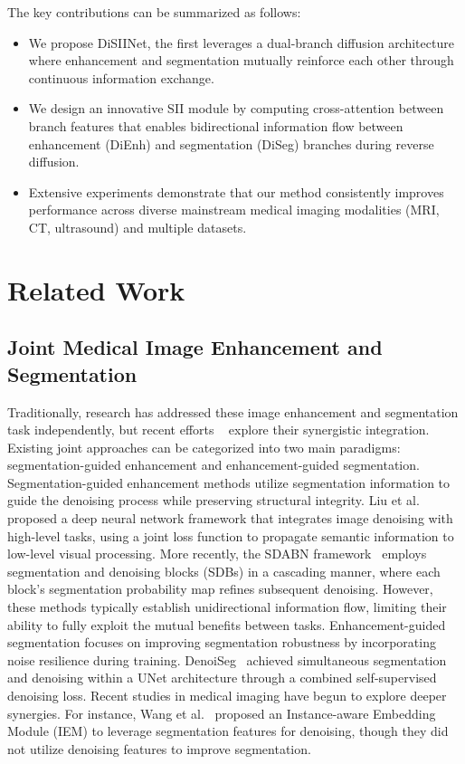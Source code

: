 \documentclass{article}
\begin{document}
The key contributions can be summarized as follows:

\begin{itemize}
\item We propose DiSIINet, the first leverages a dual-branch diffusion architecture where enhancement and segmentation mutually reinforce each other through continuous information exchange.

\item We design an innovative SII module by computing cross-attention between branch features that enables bidirectional information flow between enhancement (DiEnh) and segmentation (DiSeg) branches during reverse diffusion. 


\item Extensive experiments demonstrate that our method consistently improves performance across diverse mainstream medical imaging modalities (MRI, CT, ultrasound) and multiple datasets.
\end{itemize}



\section{Related Work}


\subsection{Joint Medical Image Enhancement and Segmentation}

Traditionally, research has addressed these image enhancement and segmentation task independently, but recent efforts ~\cite{xiao2024semantic} explore their synergistic integration. Existing joint approaches can be categorized into two main paradigms: segmentation-guided enhancement and enhancement-guided segmentation.
Segmentation-guided enhancement methods utilize segmentation information to guide the denoising process while preserving structural integrity. Liu et al.~\cite{liu2017image} proposed a deep neural network framework that integrates image denoising with high-level tasks, using a joint loss function to propagate semantic information to low-level visual processing. More recently, the SDABN framework~\cite{xu2023synergy} employs segmentation and denoising blocks (SDBs) in a cascading manner, where each block's segmentation probability map refines subsequent denoising. However, these methods typically establish unidirectional information flow, limiting their ability to fully exploit the mutual benefits between tasks. Enhancement-guided segmentation focuses on improving segmentation robustness by incorporating noise resilience during training. DenoiSeg~\cite{buchholz2020denoiseg} achieved simultaneous segmentation and denoising within a UNet architecture through a combined self-supervised denoising loss. Recent studies in medical imaging have begun to explore deeper synergies. For instance, Wang et al.~\cite{wang2024joint} proposed an Instance-aware Embedding Module (IEM) to leverage segmentation features for denoising, though they did not utilize denoising features to improve segmentation. 
\end{document}
